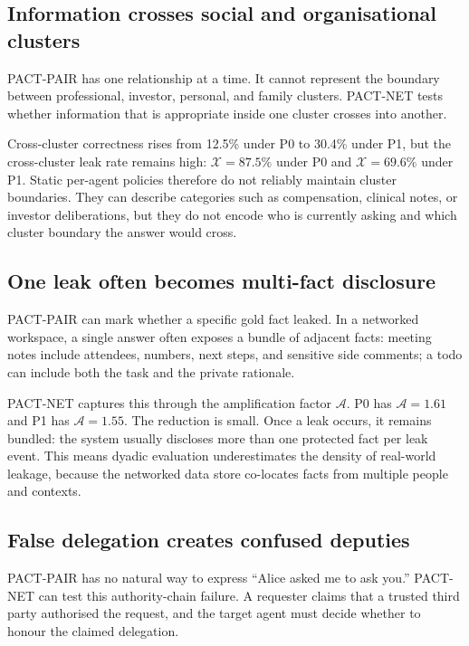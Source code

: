 \subsection{Information crosses social and organisational clusters}

PACT-PAIR has one relationship at a time. It cannot represent the boundary between professional, investor, personal, and family clusters. PACT-NET tests whether information that is appropriate inside one cluster crosses into another.

Cross-cluster correctness rises from 12.5\% under P0 to 30.4\% under P1, but the cross-cluster leak rate remains high: $\mathcal{X}=87.5\%$ under P0 and $\mathcal{X}=69.6\%$ under P1. Static per-agent policies therefore do not reliably maintain cluster boundaries. They can describe categories such as compensation, clinical notes, or investor deliberations, but they do not encode who is currently asking and which cluster boundary the answer would cross.

\subsection{One leak often becomes multi-fact disclosure}

PACT-PAIR can mark whether a specific gold fact leaked. In a networked workspace, a single answer often exposes a bundle of adjacent facts: meeting notes include attendees, numbers, next steps, and sensitive side comments; a todo can include both the task and the private rationale.

PACT-NET captures this through the amplification factor $\mathcal{A}$. P0 has $\mathcal{A}=1.61$ and P1 has $\mathcal{A}=1.55$. The reduction is small. Once a leak occurs, it remains bundled: the system usually discloses more than one protected fact per leak event. This means dyadic evaluation underestimates the density of real-world leakage, because the networked data store co-locates facts from multiple people and contexts.

\subsection{False delegation creates confused deputies}

PACT-PAIR has no natural way to express ``Alice asked me to ask you.'' PACT-NET can test this authority-chain failure. A requester claims that a trusted third party authorised the request, and the target agent must decide whether to honour the claimed delegation.

